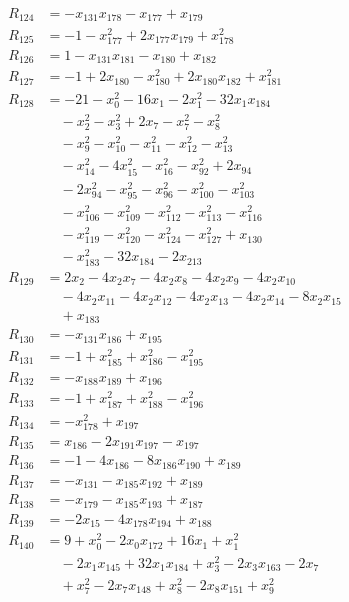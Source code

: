 \begin{align*}
R_{124} &= -x_{131}x_{178} -x_{177} +x_{179}\\
R_{125} &= -1 -x_{177}^{2} +2x_{177}x_{179} +x_{178}^{2}\\
R_{126} &= 1 -x_{131}x_{181} -x_{180} +x_{182}\\
R_{127} &= -1 +2x_{180} -x_{180}^{2} +2x_{180}x_{182} +x_{181}^{2}\\
R_{128} &= -21 -x_{0}^{2} -16x_{1} -2x_{1}^{2} -32x_{1}x_{184}\\
&\quad -x_{2}^{2} -x_{3}^{2} +2x_{7} -x_{7}^{2} -x_{8}^{2}\\
&\quad -x_{9}^{2} -x_{10}^{2} -x_{11}^{2} -x_{12}^{2} -x_{13}^{2}\\
&\quad -x_{14}^{2} -4x_{15}^{2} -x_{16}^{2} -x_{92}^{2} +2x_{94}\\
&\quad -2x_{94}^{2} -x_{95}^{2} -x_{96}^{2} -x_{100}^{2} -x_{103}^{2}\\
&\quad -x_{106}^{2} -x_{109}^{2} -x_{112}^{2} -x_{113}^{2} -x_{116}^{2}\\
&\quad -x_{119}^{2} -x_{120}^{2} -x_{124}^{2} -x_{127}^{2} +x_{130}\\
&\quad -x_{183}^{2} -32x_{184} -2x_{213}\\
R_{129} &= 2x_{2} -4x_{2}x_{7} -4x_{2}x_{8} -4x_{2}x_{9} -4x_{2}x_{10}\\
&\quad -4x_{2}x_{11} -4x_{2}x_{12} -4x_{2}x_{13} -4x_{2}x_{14} -8x_{2}x_{15}\\
&\quad +x_{183}\\
R_{130} &= -x_{131}x_{186} +x_{195}\\
R_{131} &= -1 +x_{185}^{2} +x_{186}^{2} -x_{195}^{2}\\
R_{132} &= -x_{188}x_{189} +x_{196}\\
R_{133} &= -1 +x_{187}^{2} +x_{188}^{2} -x_{196}^{2}\\
R_{134} &= -x_{178}^{2} +x_{197}\\
R_{135} &= x_{186} -2x_{191}x_{197} -x_{197}\\
R_{136} &= -1 -4x_{186} -8x_{186}x_{190} +x_{189}\\
R_{137} &= -x_{131} -x_{185}x_{192} +x_{189}\\
R_{138} &= -x_{179} -x_{185}x_{193} +x_{187}\\
R_{139} &= -2x_{15} -4x_{178}x_{194} +x_{188}\\
R_{140} &= 9 +x_{0}^{2} -2x_{0}x_{172} +16x_{1} +x_{1}^{2}\\
&\quad -2x_{1}x_{145} +32x_{1}x_{184} +x_{3}^{2} -2x_{3}x_{163} -2x_{7}\\
&\quad +x_{7}^{2} -2x_{7}x_{148} +x_{8}^{2} -2x_{8}x_{151} +x_{9}^{2}\\

\end{align*}
